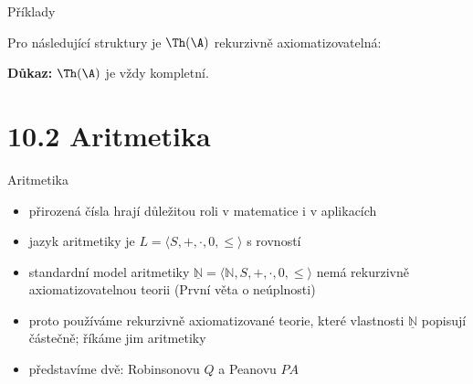 \documentclass{beamer}
\begin{document}
\begin{frame}{Příklady}

    Pro následující struktury je $\Th(\A)$ rekurzivně axiomatizovatelná:


    \medskip

    \pause
    \pause
    \textbf{Důkaz:} $\Th(\A)$ je vždy kompletní.

    \pause

\end{frame}


\section{10.2 Aritmetika}


\begin{frame}{Aritmetika}

    \begin{itemize}[<+->]
        \item přirozená čísla hrají důležitou roli v matematice i v aplikacích
        \item \alert{jazyk aritmetiky} je $L=\langle S,+,\cdot,0,\leq\rangle$ s rovností
        \item \alert{standardní model aritmetiky}  $\underline{\mathbb N}=\langle\mathbb N,S,+,\cdot,0,\leq\rangle$ nemá rekurzivně axiomatizovatelnou teorii (První věta o neúplnosti)
        \item proto používáme rekurzivně axiomatizované teorie, které vlastnosti $\underline{\mathbb N}$ popisují částečně; říkáme jim \alert{aritmetiky}       
        \item představíme dvě: \alert{Robinsonovu} $Q$ a \alert{Peanovu} $PA$
    \end{itemize}

\end{frame}
\end{document}
